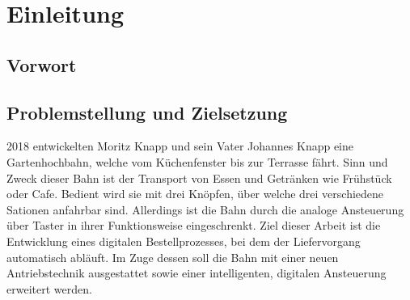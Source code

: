 \chapter{Einleitung}

\section{Vorwort}

\section{Problemstellung und Zielsetzung}
    2018 entwickelten Moritz Knapp und sein Vater Johannes Knapp eine Gartenhochbahn, welche vom Küchenfenster bis zur Terrasse fährt. 
    Sinn und Zweck dieser Bahn ist der Transport von Essen und Getränken wie Frühstück oder Cafe. Bedient wird sie mit drei Knöpfen, über welche  drei verschiedene Sationen anfahrbar sind.
    Allerdings ist die Bahn durch die analoge Ansteuerung über Taster in ihrer Funktionsweise eingeschrenkt. Ziel dieser Arbeit ist die Entwicklung eines digitalen Bestellprozesses, bei dem der Liefervorgang automatisch abläuft. Im Zuge dessen soll die Bahn mit einer neuen Antriebstechnik ausgestattet sowie einer intelligenten, digitalen Ansteuerung erweitert werden. 
